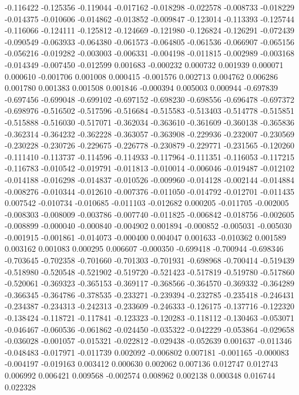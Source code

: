 -0.116422
-0.125356
-0.119044
-0.017162
-0.018298
-0.022578
-0.008733
-0.018229
-0.014375
-0.010606
-0.014862
-0.013852
-0.009847
-0.123014
-0.113393
-0.125744
-0.116066
-0.124111
-0.125812
-0.124669
-0.121980
-0.126824
-0.126291
-0.072439
-0.090549
-0.063933
-0.064380
-0.061573
-0.064805
-0.061536
-0.066907
-0.065156
-0.056216
-0.019282
-0.003003
-0.006331
-0.004198
-0.011815
-0.002989
-0.003168
-0.014349
-0.007450
-0.012599
0.001683
-0.000232
0.000732
0.001939
0.000071
0.000610
-0.001706
0.001008
0.000415
-0.001576
0.002713
0.004762
0.006286
0.001780
0.001383
0.001508
0.001846
-0.000394
0.005003
0.000944
-0.697839
-0.697456
-0.699048
-0.699102
-0.697152
-0.698230
-0.698556
-0.696478
-0.697372
-0.698976
-0.516502
-0.517596
-0.516684
-0.515583
-0.513403
-0.514778
-0.515851
-0.515888
-0.516030
-0.517071
-0.362034
-0.363610
-0.361609
-0.360138
-0.365836
-0.362314
-0.364232
-0.362228
-0.363057
-0.363908
-0.229936
-0.232007
-0.230569
-0.230228
-0.230726
-0.229675
-0.226778
-0.230879
-0.229771
-0.231565
-0.120260
-0.111410
-0.113737
-0.114596
-0.114933
-0.117964
-0.111351
-0.116053
-0.117215
-0.116783
-0.010542
-0.019791
-0.011813
-0.010014
-0.006046
-0.019487
-0.012102
-0.014188
-0.016298
-0.014837
-0.010526
-0.009960
-0.014128
-0.002144
-0.014884
-0.008276
-0.010344
-0.012610
-0.007376
-0.011050
-0.014792
-0.012701
-0.011435
0.007542
-0.010734
-0.010685
-0.011103
-0.012682
0.000205
-0.011705
-0.002005
-0.008303
-0.008009
-0.003786
-0.007740
-0.011825
-0.006842
-0.018756
-0.002605
-0.008899
-0.000040
-0.000840
-0.004902
0.001894
-0.000852
-0.005031
-0.005030
-0.001915
-0.001861
-0.014073
-0.000400
0.004047
0.001633
-0.010362
0.001589
0.003162
0.001083
0.000295
0.006607
-0.000350
-0.699418
-0.700944
-0.698346
-0.703645
-0.702358
-0.701660
-0.701303
-0.701931
-0.698968
-0.700414
-0.519439
-0.518980
-0.520548
-0.521902
-0.519720
-0.521423
-0.517819
-0.519780
-0.517860
-0.520061
-0.369323
-0.365153
-0.369117
-0.368566
-0.364570
-0.369332
-0.364289
-0.366345
-0.364786
-0.378535
-0.233271
-0.239394
-0.232785
-0.235418
-0.246431
-0.234387
-0.234313
-0.242313
-0.233609
-0.246333
-0.126175
-0.137716
-0.122320
-0.138424
-0.118721
-0.117841
-0.123323
-0.120283
-0.118112
-0.130463
-0.053071
-0.046467
-0.060536
-0.061862
-0.024450
-0.035322
-0.042229
-0.053864
-0.029658
-0.036028
-0.001057
-0.015321
-0.022812
-0.029438
-0.052639
0.001637
-0.011346
-0.048483
-0.017971
-0.011739
0.002092
-0.006802
0.007181
-0.001165
-0.000083
-0.004197
-0.019163
0.003412
0.000630
0.002062
0.007136
0.012747
0.012743
0.006992
0.006421
0.009568
-0.002574
0.008962
0.002138
0.000348
0.016744
0.022328
